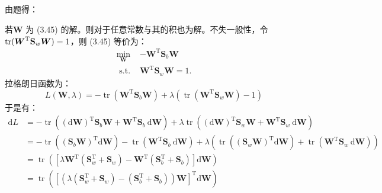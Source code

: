 \documentclass[UTF8,a4paper,AutoFakeBold,AutoFakeSlant]{article}
\begin{document}
\subsection{}

由题得：

若$\boldsymbol{W}$ 为 (3.45) 的解。则对于任意常数与其的积也为解。不失一般性，令
$\operatornamewithlimits{tr}(\boldsymbol{W}^{\mathrm{T}} \mathbf{S}_{w} \boldsymbol{W})  = 1 $，则 (3.45) 等价为：
\begin{equation*}
  \begin{aligned}
    \min _{\boldsymbol{W}} & -\boldsymbol{W}^{\mathrm{T}} \mathbf{S}_{b} \boldsymbol{W}       \\
    \text { s.t. }         & \boldsymbol{W}^{\mathrm{T}} \mathbf{S}_{w} \boldsymbol{W}  = 1 .
  \end{aligned}
\end{equation*}
拉格朗日函数为：
\begin{equation*}
  L(\boldsymbol{W}, \lambda)=-\operatorname{tr}\left(\boldsymbol{W}^{\mathrm{T}} \boldsymbol{S}_{b} \boldsymbol{W}\right)+\lambda\left(\operatorname{tr}\left(\boldsymbol{W}^{\mathrm{T}} \boldsymbol{S}_{w} \boldsymbol{W}\right)-1\right)
\end{equation*}
于是有：
\begin{equation*}
  \begin{aligned}
    \mathrm{d} L & =-\operatorname{tr}\left((\mathrm{d} \boldsymbol{W})^{\mathrm{T}} \boldsymbol{S}_{b} \boldsymbol{W}+\boldsymbol{W}^{\mathrm{T}} \boldsymbol{S}_{b} \mathrm{~d} \boldsymbol{W}\right)+\lambda \operatorname{tr}\left((\mathrm{d} \boldsymbol{W})^{\mathrm{T}} \boldsymbol{S}_{w} \boldsymbol{W}+\boldsymbol{W}^{\mathrm{T}} \boldsymbol{S}_{w} \mathrm{~d} \boldsymbol{W}\right)                                                                                               \\
                 & =-\operatorname{tr}\left(\left(\boldsymbol{S}_{b} \boldsymbol{W}\right)^{\mathrm{T}} \mathrm{d} \boldsymbol{W}\right)-\operatorname{tr}\left(\boldsymbol{W}^{\mathrm{T}} \boldsymbol{S}_{b} \mathrm{~d} \boldsymbol{W}\right)+\lambda\left(\operatorname{tr}\left(\left(\boldsymbol{S}_{w} \boldsymbol{W}\right)^{\mathrm{T}} \mathrm{d} \boldsymbol{W}\right)+\operatorname{tr}\left(\boldsymbol{W}^{\mathrm{T}} \boldsymbol{S}_{w} \mathrm{~d} \boldsymbol{W}\right)\right) \\
                 & =\operatorname{tr}\left(\left[\lambda \boldsymbol{W}^{\mathrm{T}}\left(\boldsymbol{S}_{w}^{\mathrm{T}}+\boldsymbol{S}_{w}\right)-\boldsymbol{W}^{\mathrm{T}}\left(\boldsymbol{S}_{b}^{\mathrm{T}}+\boldsymbol{S}_{b}\right)\right] \mathrm{d} \boldsymbol{W}\right)                                                                                                                                                                                                           \\
                 & =\operatorname{tr}\left(\left[\left(\lambda\left(\boldsymbol{S}_{w}^{\mathrm{T}}+\boldsymbol{S}_{w}\right)-\left(\boldsymbol{S}_{b}^{\mathrm{T}}+\boldsymbol{S}_{b}\right)\right) \boldsymbol{W}\right]^{\mathrm{T}} \mathrm{d} \boldsymbol{W}\right)
  \end{aligned}
\end{equation*}
\end{document}
